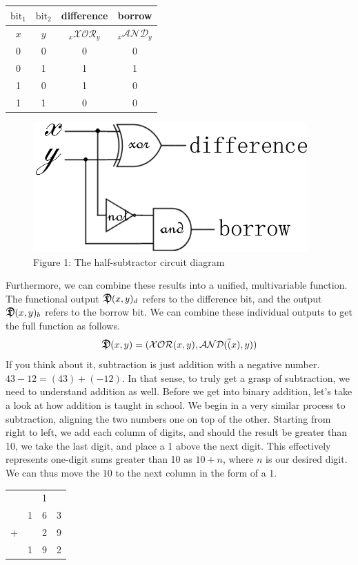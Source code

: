 \documentclass[oneside]{book}
\begin{document}
\begin{center}
\begin{tabular}{|c|c|c|c|}
\hline
$\mathrm{bit}_1$ & $\mathrm{bit}_2$ & difference & borrow \\
\hline
$x$ & $y$ & $_x\mathcal{XOR}_y$ & $_{\overline{x}}\mathcal{AND}_y$ \\
\hline
0 & 0 & 0 &0 \\
\hline
0 & 1 & 1 & 1 \\
\hline
1 & 0 & 1 & 0\\
\hline
1 & 1 & 0 & 0\\
\hline
\end{tabular}
\end{center}
\begin{figure}[h]
\centering
\includegraphics[scale=0.75]{halfsub}
\captionsetup{labelformat=empty}
\caption{Figure 1: The half-subtractor circuit diagram}
\end{figure}
\tab
Furthermore, we can combine these results into a unified, multivariable function. The functional output $\Sub(x,y)_d$ refers to the difference bit, and the output $\Sub(x,y)_b$ refers to the borrow bit. We can combine these individual outputs to get the full function as follows.
$$
\Sub(x,y) = (\mathcal{XOR}(x,y), \mathcal{AND}(\overline(x),y))
$$
\tab
If you think about it, subtraction is just addition with a negative number. $43-12 = (43) + (-12)$. In that sense, to truly get a grasp of subtraction, we need to understand addition as well. Before we get into binary addition, let's take a look at how addition is taught in school. We begin in a very similar process to subtraction, aligning the two numbers one on top of the other. Starting from right to left, we add each column of digits, and should the result be greater than 10, we take the last digit, and place a 1 above the next digit. This effectively represents one-digit sums greater than 10 as $10 + n$, where $n$ is our desired digit. We can thus move the $10$ to the next column in the form of a $1$.
\begin{center}
\begin{tabular}{c c c c}
& & 1 & \\
&1&6&3\\
+& &2&9\\
\hline
& 1 & 9 & 2
\end{tabular}
\end{center}
\end{document}

